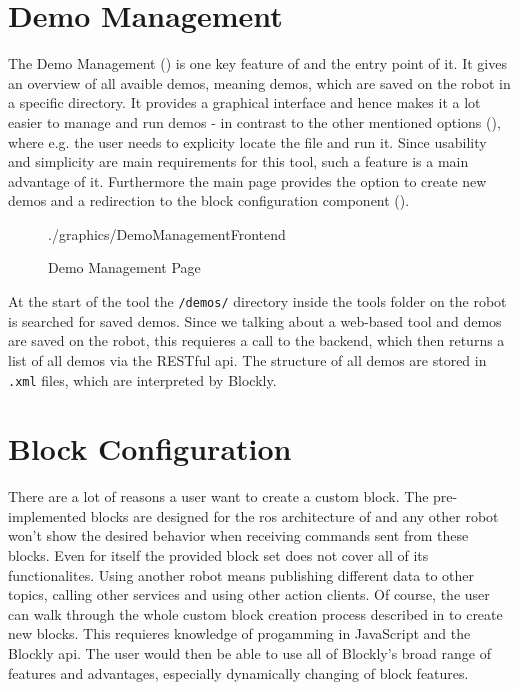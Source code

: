 \section{Demo Management}
The Demo Management () is one key feature of \toolname{} and the entry point of it. It gives an overview of all avaible demos, meaning demos, which are saved on the robot in a specific directory. It provides a graphical interface and hence makes it a lot easier to manage and run demos - in contrast to the other mentioned options (), where e.g. the user needs to explicity locate the file and run it. Since usability and simplicity are main requirements for this tool, such a feature is a main advantage of it. Furthermore the main page provides the option to create new demos and a redirection to the block configuration component ().

\begin{figure}[htbp]
	\centering
	\begin{overpic}[width=\linewidth]{./graphics/DemoManagementFrontend}
	\end{overpic}
	\caption{Demo Management Page}%
	\label{fig:DemoManagement}%
\end{figure}

At the start of the tool the \lstinline!/demos/! directory inside the tools folder on the robot is searched for saved demos. Since we talking about a web-based tool and demos are saved on the robot, this requieres a call to the backend, which then returns a list of all demos via the RESTful \gls{api}. The structure of all demos are stored in \lstinline!.xml! files, which are interpreted by Blockly.

\section{Block Configuration} \label{sec:BlockConfiguration}
There are a lot of reasons a user want to create a custom block. The pre-implemented blocks are designed for the \gls{ros} architecture of \hobbit{} and any other robot won't show the desired behavior when receiving commands sent from these blocks. Even for \hobbit{} itself the provided block set does not cover all of its functionalites. Using another robot means publishing different data to other topics, calling other services and using other action clients. Of course, the user can walk through the whole custom block creation process described in  to create new blocks. This requieres knowledge of progamming in JavaScript and the Blockly \gls{api}. The user would then be able to use all of Blockly's broad range of features and advantages, especially dynamically changing of block features.

